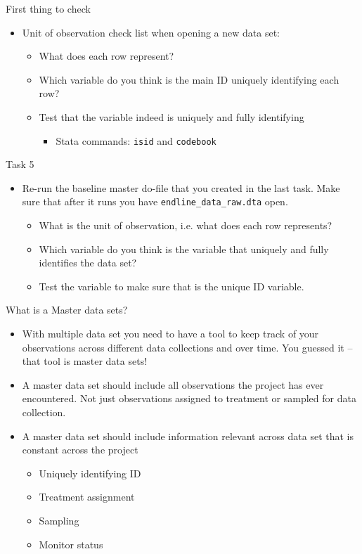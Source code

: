 \documentclass[aspectratio=169]{beamer}
\begin{document}
\begin{frame}{First thing to check}
	\begin{itemize}
		\item Unit of observation check list when opening a new data set:
		\begin{itemize}
			\item What does each row represent?
			\item Which variable do you think is the main ID uniquely identifying each row?
			\item Test that the variable indeed is uniquely and fully identifying
			\begin{itemize}
				\item Stata commands: \texttt{isid} and \texttt{codebook}
			\end{itemize}		
		\end{itemize}
	\end{itemize}
\end{frame}


\begin{frame}{Task 5}
	\begin{itemize}
		\item Re-run the baseline master do-file that you created in the last task. Make sure that after it runs you have  \texttt{endline\_data\_raw.dta} open.
		\begin{itemize}
			\item What is the unit of observation, i.e. what does each row represents?		
			\item Which variable do you think is the variable that uniquely and fully identifies the data set?		
			\item Test the variable to make sure that is the unique ID variable.
		\end{itemize}
	\end{itemize}
\end{frame}


\begin{frame}{What is a Master data sets?}
	\begin{itemize}
		\item With multiple data set you need to have a tool to keep track of your observations across different data collections and over time. You guessed it – that tool is master data sets!
		\item A master data set should include all observations the project has ever encountered. Not just observations assigned to treatment or sampled for data collection.
		\item A master data set should include information relevant across data set that is constant across the project
		\begin{itemize}
			\item Uniquely identifying ID
			\item Treatment assignment
			\item Sampling
			\item Monitor status		
		\end{itemize}
	\end{itemize}
\end{frame}
\end{document}
